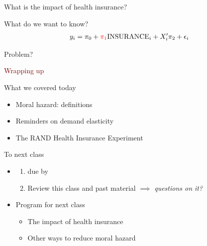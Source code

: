 \begin{frame}{What is the impact of health insurance?}

    What do we want to know?
    \begin{align*}
        y_{i} = \pi_0 + {\color{red} \pi_1} \text{INSURANCE}_i + X'_{i} \pi_2 + \epsilon_{i}
    \end{align*}
    \vspace{3mm}

    Problem? 


\end{frame}
\begin{frame}{}
    \begin{center}
    \Large \textcolor{maroon}{Wrapping up}
    \end{center}
\end{frame}
\begin{frame}{What we covered today}
    \begin{itemize}
    \item Moral hazard: definitions
    \item Reminders on demand elasticity
    \item The RAND Health Insurance Experiment
\end{itemize}
\end{frame}
\begin{frame}{To next class}
\begin{itemize}
    \item {}
    \begin{enumerate}
        \item {} due by 
        \item Review this class and past material $\implies$ \textit{questions on it?}
    \end{enumerate}
    \vspace{5mm}

    \item Program for next class
    \begin{itemize}
        \item The impact of health insurance
        \item Other ways to reduce moral hazard
    \end{itemize}
\end{itemize}
\end{frame}
